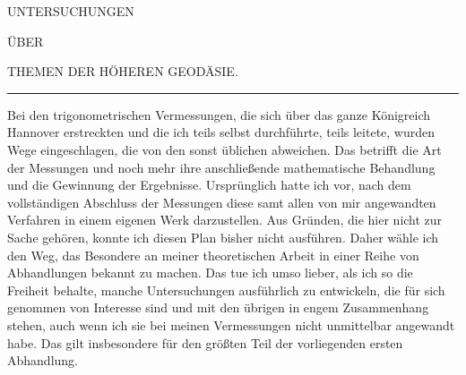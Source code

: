 \renewcommand{\Article}[1]{\par\medskip\Needspace{4\baselineskip}\pdfbookmark[1]{Art. #1}{geodaesie1-art-#1}\centerline{\textbf{#1.}}\nobreak\smallskip}
\begin{center}
UNTERSUCHUNGEN\par\bigskip
ÜBER\par\bigskip
{\large THEMEN DER HÖHEREN GEODÄSIE.}\par\medskip
\rule{.65in}{.3pt}
\end{center}
\noindent\hspace*{\parindent}Bei den trigonometrischen Vermessungen, die sich über das ganze Königreich Hannover erstreckten und die ich teils selbst durchführte, teils leitete, wurden Wege eingeschlagen, die von den sonst üblichen abweichen. Das betrifft die Art der Messungen und noch mehr ihre anschließende mathematische Behandlung und die Gewinnung der Ergebnisse. Ursprünglich hatte ich vor, nach dem vollständigen Abschluss der Messungen diese samt allen von mir angewandten Verfahren in einem eigenen Werk darzustellen. Aus Gründen, die hier nicht zur Sache gehören, konnte ich diesen Plan bisher nicht ausführen. Daher wähle ich den Weg, das Besondere an meiner theoretischen Arbeit in einer Reihe von Abhandlungen bekannt zu machen. Das tue ich umso lieber, als ich so die Freiheit behalte, manche Untersuchungen ausführlich zu entwickeln, die für sich genommen von Interesse sind und mit den übrigen in engem Zusammenhang stehen, auch wenn ich sie bei meinen Vermessungen nicht unmittelbar angewandt habe. Das gilt insbesondere für den größten Teil der vorliegenden ersten Abhandlung.
